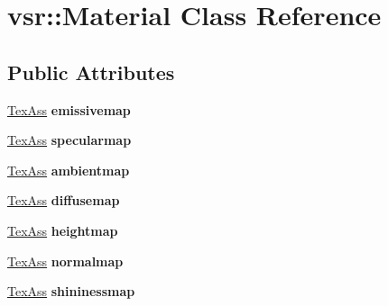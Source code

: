 \hypertarget{classvsr_1_1_material}{\section{vsr\-:\-:Material Class Reference}
\label{classvsr_1_1_material}
}
\subsection*{Public Attributes}
\begin{DoxyCompactItemize}
\item 
\hypertarget{classvsr_1_1_material_a8113167708f7e05a6240fe13e28a86dc}{\hyperlink{structvsr_1_1_tex_ass}{Tex\-Ass} {\bfseries emissivemap}}\label{classvsr_1_1_material_a8113167708f7e05a6240fe13e28a86dc}

\item 
\hypertarget{classvsr_1_1_material_a31c37b6f5fa93f5f07216b7b67ab7478}{\hyperlink{structvsr_1_1_tex_ass}{Tex\-Ass} {\bfseries specularmap}}\label{classvsr_1_1_material_a31c37b6f5fa93f5f07216b7b67ab7478}

\item 
\hypertarget{classvsr_1_1_material_a78c18a22dbde4a4a55f8c58b4c8870f4}{\hyperlink{structvsr_1_1_tex_ass}{Tex\-Ass} {\bfseries ambientmap}}\label{classvsr_1_1_material_a78c18a22dbde4a4a55f8c58b4c8870f4}

\item 
\hypertarget{classvsr_1_1_material_a0c01181de99286b577cf2ac1e7df9bc3}{\hyperlink{structvsr_1_1_tex_ass}{Tex\-Ass} {\bfseries diffusemap}}\label{classvsr_1_1_material_a0c01181de99286b577cf2ac1e7df9bc3}

\item 
\hypertarget{classvsr_1_1_material_aa121f677d8069a7fd3a02893b80b357c}{\hyperlink{structvsr_1_1_tex_ass}{Tex\-Ass} {\bfseries heightmap}}\label{classvsr_1_1_material_aa121f677d8069a7fd3a02893b80b357c}

\item 
\hypertarget{classvsr_1_1_material_a6a3ee655270761079ba02093fc57b345}{\hyperlink{structvsr_1_1_tex_ass}{Tex\-Ass} {\bfseries normalmap}}\label{classvsr_1_1_material_a6a3ee655270761079ba02093fc57b345}

\item 
\hypertarget{classvsr_1_1_material_abb313e42550779b2bac3f7db7236f0bf}{\hyperlink{structvsr_1_1_tex_ass}{Tex\-Ass} {\bfseries shininessmap}}\label{classvsr_1_1_material_abb313e42550779b2bac3f7db7236f0bf}


\end{DoxyCompactItemize}
